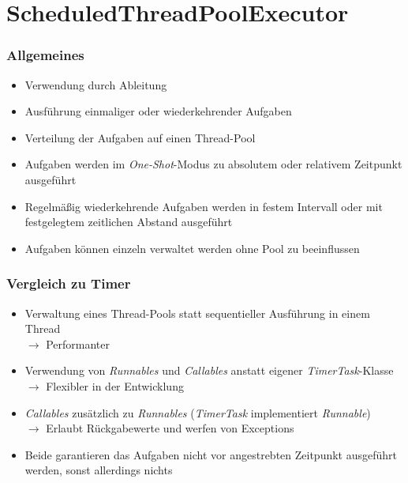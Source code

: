 \section{ScheduledThreadPoolExecutor}
\begin{frame}
   \frametitle{Allgemeines}
   \begin{itemize}
     	\item Verwendung durch Ableitung
     	\item Ausführung einmaliger oder wiederkehrender Aufgaben
     	\item Verteilung der Aufgaben auf einen Thread-Pool
     	\item Aufgaben werden im \emph{One-Shot}-Modus zu absolutem 
     		oder relativem Zeitpunkt ausgeführt
     	\item Regelmäßig wiederkehrende Aufgaben werden in festem Intervall oder 
     		mit festgelegtem zeitlichen Abstand ausgeführt
     	\item Aufgaben können einzeln verwaltet werden ohne Pool zu beeinflussen
   \end{itemize}
\end{frame}

\begin{frame}
   \frametitle{Vergleich zu Timer}
   \begin{itemize}
     	\item Verwaltung eines Thread-Pools statt sequentieller Ausführung in einem 
     		Thread\\
     		$\rightarrow$ Performanter
     	\item Verwendung von \emph{Runnables} und \emph{Callables} anstatt 
     		eigener \emph{TimerTask}-Klasse\\
     		$\rightarrow$ Flexibler in der Entwicklung
     	\item \emph{Callables} zusätzlich zu \emph{Runnables} (\emph{TimerTask} 
     		implementiert \emph{Runnable})\\
     		$\rightarrow$ Erlaubt Rückgabewerte und werfen von Exceptions
     	\item Beide garantieren das Aufgaben nicht vor angestrebten Zeitpunkt 
     		ausgeführt werden, sonst allerdings nichts
   \end{itemize}
\end{frame}

